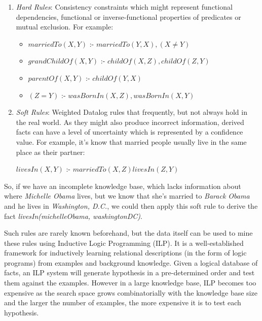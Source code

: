 \begin{enumerate}
 \item \emph{Hard Rules}: Consistency constraints which might represent functional dependencies, functional or
inverse-functional properties of predicates or mutual exclusion. For example:
    \begin{itemize}
      \item $ marriedTo(X,Y)$ :- $marriedTo(Y,X),(X \neq Y)$
      \item $ grandChildOf(X,Y)$ :- $childOf(X,Z),childOf(Z,Y)$
      \item $ parentOf(X,Y)$ :- $childOf(Y,X)$
      \item $ (Z=Y)$ :- $wasBornIn(X,Z),wasBornIn(X,Y)$
    \end{itemize}

 \item \emph{Soft Rules}: Weighted Datalog rules that frequently, but not always hold in the real world. As they
might also produce incorrect information, derived facts can have a level of uncertainty which is represented by a
confidence value. For example, it's know that married people usually live in the same place as their partner:
    \begin{center}
      $ livesIn(X,Y)$ :- $marriedTo(X,Z)livesIn(Z,Y)$
    \end{center}
\end{enumerate}

So, if we have an incomplete knowledge base, which lacks information about where \emph{Michelle Obama} lives, but
we know that she's married to \emph{Barack Obama} and he lives in \emph{Washington, D.C.}, we could then apply this soft
rule to derive the fact \emph{livesIn(michelleObama, washingtonDC)}. 


Such rules are rarely known beforehand, but the data itself can be used to mine these rules using Inductive Logic
Programming (ILP). It is a well-established framework for inductively learning relational descriptions (in the form of
logic programs) from examples and background knowledge. Given a logical database of facts, an ILP system will generate
hypothesis in a pre-determined order and test them against the examples. However in a large knowledge base, ILP becomes
too expensive as the search space grows combinatorially with the knowledge base size and the larger the number of
examples, the more expensive it is to test each hypothesis.

